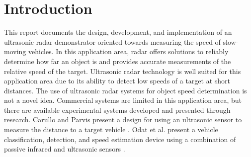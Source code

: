 \documentclass[class=report,11pt,crop=false]{standalone}
\begin{document}
\chapter{Introduction \label{ch:introduction}}
\vspace{-1cm}
This report documents the design, development, and implementation of an ultrasonic \gls{radar} demonstrator oriented towards measuring the speed of slow-moving vehicles. In this application area, radar offers solutions to reliably determine how far an object is and provides accurate measurements of the relative speed of the target. Ultrasonic radar technology is well suited for this application area due to its ability to detect low speeds of a target at short distances. The use of ultrasonic \gls{radar} systems for object speed determination is not a novel idea. Commercial systems are limited in this application area, but there are available experimental systems developed and presented through research. Carullo and Parvis present a design for using an ultrasonic sensor to measure the distance to a target vehicle \cite{carullo}. Odat et al. present a vehicle classification, detection, and speed estimation device using a combination of passive infrared and ultrasonic sensors \cite{enas}.
\end{document}
